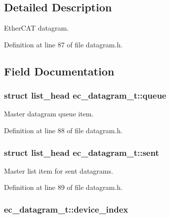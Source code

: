 \subsection{\-Detailed \-Description}
\-Ether\-C\-A\-T datagram. 

\-Definition at line 87 of file datagram.\-h.



\subsection{\-Field \-Documentation}
\subsubsection[{queue}]{\setlength{\rightskip}{0pt plus 5cm}struct list\-\_\-head {\bf ec\-\_\-datagram\-\_\-t\-::queue}}\label{structec__datagram__t_a6e6acbb9301ecc6f382740eae531f00a}


\-Master datagram queue item. 



\-Definition at line 88 of file datagram.\-h.

\subsubsection[{sent}]{\setlength{\rightskip}{0pt plus 5cm}struct list\-\_\-head {\bf ec\-\_\-datagram\-\_\-t\-::sent}}\label{structec__datagram__t_aa1ff1596b3e36d19123be609dbf3de46}


\-Master list item for sent datagrams. 



\-Definition at line 89 of file datagram.\-h.

\subsubsection[{device\-\_\-index}]{ {\bf ec\-\_\-datagram\-\_\-t\-::device\-\_\-index}}\label{structec__datagram__t_a9804c4ebdbd3e7ff5b55bfe3aa33bbef}


